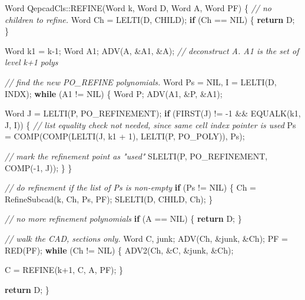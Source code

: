 \documentclass[
]{book}
\newenvironment{Shaded}{\begin{snugshade}}{\end{snugshade}}
\newcommand{\CommentTok}[1]{\textcolor[rgb]{0.56,0.35,0.01}{\textit{#1}}}
\newcommand{\ControlFlowTok}[1]{\textcolor[rgb]{0.13,0.29,0.53}{\textbf{#1}}}
\newcommand{\DecValTok}[1]{\textcolor[rgb]{0.00,0.00,0.81}{#1}}
\newcommand{\NormalTok}[1]{#1}
\theoremstyle{definition}
\theoremstyle{definition}
\theoremstyle{definition}
\theoremstyle{definition}
\theoremstyle{remark}
\begin{document}
\begin{Shaded}
\begin{Highlighting}[numbers=left,,]
\NormalTok{Word QepcadCls::REFINE(Word k, Word D, Word A, Word PF)}
\NormalTok{\{}
    \CommentTok{// no children to refine.}
\NormalTok{    Word Ch = LELTI(D, CHILD);}
    \ControlFlowTok{if}\NormalTok{ (Ch == NIL) \{}
        \ControlFlowTok{return}\NormalTok{ D;}
\NormalTok{    \}}

\NormalTok{    Word k1 = k{-}}\DecValTok{1}\NormalTok{;}
\NormalTok{    Word A1;}
\NormalTok{    ADV(A, \&A1, \&A); }\CommentTok{// deconstruct A. A1 is the set of level k+1 polys}

    \CommentTok{// find the new PO\_REFINE polynomials.}
\NormalTok{    Word Ps = NIL, I = LELTI(D, INDX);}
    \ControlFlowTok{while}\NormalTok{ (A1 != NIL) \{}
\NormalTok{        Word P;}
\NormalTok{        ADV(A1, \&P, \&A1);}

\NormalTok{        Word J = LELTI(P, PO\_REFINEMENT);}
        \ControlFlowTok{if}\NormalTok{ (FIRST(J) != {-}}\DecValTok{1}\NormalTok{ \&\& EQUALK(k1, J, I)) \{ }\CommentTok{// list equality check not needed, since same cell index pointer is used}
\NormalTok{            Ps = COMP(COMP(LELTI(J, k1 + }\DecValTok{1}\NormalTok{), LELTI(P, PO\_POLY)), Ps);}

            \CommentTok{// mark the refinement point as "used"}
\NormalTok{            SLELTI(P, PO\_REFINEMENT, COMP({-}}\DecValTok{1}\NormalTok{, J));}
\NormalTok{        \}}
\NormalTok{    \}}

    \CommentTok{// do refinement if the list of Ps is non{-}empty}
    \ControlFlowTok{if}\NormalTok{ (Ps != NIL) \{}
\NormalTok{        Ch = RefineSubcad(k, Ch, Ps, PF);}
\NormalTok{        SLELTI(D, CHILD, Ch);}
\NormalTok{    \}}

    \CommentTok{// no more refinement polynomials}
    \ControlFlowTok{if}\NormalTok{ (A == NIL) \{}
        \ControlFlowTok{return}\NormalTok{ D;}
\NormalTok{    \}}

    \CommentTok{// walk the CAD, sections only.}
\NormalTok{    Word C, junk;}
\NormalTok{    ADV(Ch, \&junk, \&Ch);}
\NormalTok{    PF = RED(PF);}
    \ControlFlowTok{while}\NormalTok{ (Ch != NIL) \{}
\NormalTok{        ADV2(Ch, \&C, \&junk, \&Ch);}

\NormalTok{        C = REFINE(k+}\DecValTok{1}\NormalTok{, C, A, PF);}
\NormalTok{    \}}

    \ControlFlowTok{return}\NormalTok{ D;}
\NormalTok{\}}
\end{Highlighting}
\end{Shaded}
\end{document}
